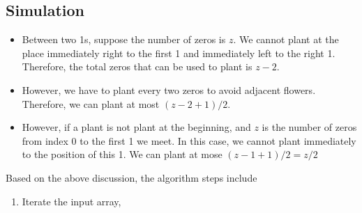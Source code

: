 \subsection{Simulation}
\begin{itemize}
    \item Between two 1s, suppose the number of zeros is $z$. We cannot plant at the place immediately right to the first 1 and immediately left to the right 1. Therefore, the total zeros that can be used to plant is $z-2$. 
    \item However, we have to plant every two zeros to avoid adjacent flowers. Therefore, we can plant at most $(z-2+1)/2$.
    \item However, if a plant is not plant at the beginning, and $z$ is the number of zeros from index 0 to the first 1 we meet. In this case, we cannot plant immediately to the position of this 1. We can plant at mose $(z-1+1)/2 = z/2$
\end{itemize}

Based on the above discussion, the algorithm steps include
\begin{enumerate}
    \item Iterate the input array, 
\end{enumerate}